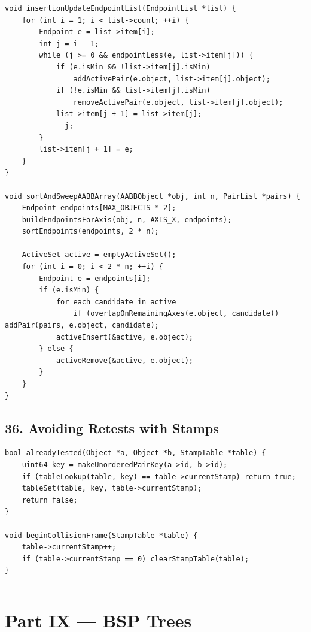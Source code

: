 \documentclass[10pt,letterpaper]{article}
\begin{document}
\begin{verbatim}
void insertionUpdateEndpointList(EndpointList *list) {
    for (int i = 1; i < list->count; ++i) {
        Endpoint e = list->item[i];
        int j = i - 1;
        while (j >= 0 && endpointLess(e, list->item[j])) {
            if (e.isMin && !list->item[j].isMin)
                addActivePair(e.object, list->item[j].object);
            if (!e.isMin && list->item[j].isMin)
                removeActivePair(e.object, list->item[j].object);
            list->item[j + 1] = list->item[j];
            --j;
        }
        list->item[j + 1] = e;
    }
}

void sortAndSweepAABBArray(AABBObject *obj, int n, PairList *pairs) {
    Endpoint endpoints[MAX_OBJECTS * 2];
    buildEndpointsForAxis(obj, n, AXIS_X, endpoints);
    sortEndpoints(endpoints, 2 * n);

    ActiveSet active = emptyActiveSet();
    for (int i = 0; i < 2 * n; ++i) {
        Endpoint e = endpoints[i];
        if (e.isMin) {
            for each candidate in active
                if (overlapOnRemainingAxes(e.object, candidate)) addPair(pairs, e.object, candidate);
            activeInsert(&active, e.object);
        } else {
            activeRemove(&active, e.object);
        }
    }
}
\end{verbatim}


\subsection*{36. Avoiding Retests with Stamps}

\begin{verbatim}
bool alreadyTested(Object *a, Object *b, StampTable *table) {
    uint64 key = makeUnorderedPairKey(a->id, b->id);
    if (tableLookup(table, key) == table->currentStamp) return true;
    tableSet(table, key, table->currentStamp);
    return false;
}

void beginCollisionFrame(StampTable *table) {
    table->currentStamp++;
    if (table->currentStamp == 0) clearStampTable(table);
}
\end{verbatim}

\medskip\hrule\medskip


\clearpage
{}
\section*{Part IX --- BSP Trees}
\end{document}
